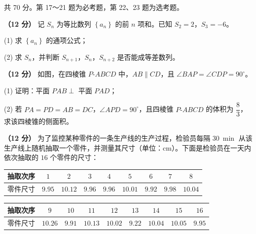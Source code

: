 \par\medskip


\begin{gktip}
共 70 分。第 17～21 题为必考题，第 22、23 题为选考题。
\end{gktip}


\textbf{（12 分）} 记 $S_n$ 为等比数列 $\left\{a_n\right\}$ 的前 $n$ 项和。已知 $S_2=2$，$S_3=-6$。

  (1) 求 $\left\{a_n\right\}$ 的通项公式；

  (2) 求 $S_n$，并判断 $S_{n+1}$，$S_n$，$S_{n+2}$ 是否能成等差数列。

\textbf{（12 分）} 如图，在四棱锥 $P\text{-}ABCD$ 中，$AB\parallel CD$，且 $\angle BAP=\angle CDP=90^\circ$。

\begin{center}\end{center}

  (1) 证明：平面 $PAB\perp$ 平面 $PAD$；

  (2) 若 $PA=PD=AB=DC$，$\angle APD=90^\circ$，且四棱锥 $P\text{-}ABCD$ 的体积为 $\dfrac83$，求该四棱锥的侧面积。

\textbf{（12 分）} 为了监控某种零件的一条生产线的生产过程，检验员每隔 $30\ \min$ 从该生产线上随机抽取一个零件，并测量其尺寸（单位：$\mathrm{cm}$）。下面是检验员在一天内依次抽取的 $16$ 个零件的尺寸：

\begin{center}
\begin{tabular}{ccccccccc}
\toprule
抽取次序 & $1$ & $2$ & $3$ & $4$ & $5$ & $6$ & $7$ & $8$ \\
\midrule
零件尺寸 & $9.95$ & $10.12$ & $9.96$ & $9.96$ & $10.01$ & $9.92$ & $9.98$ & $10.04$ \\
\bottomrule
\end{tabular}
\end{center}

\begin{center}
\begin{tabular}{ccccccccc}
\toprule
抽取次序 & $9$ & $10$ & $11$ & $12$ & $13$ & $14$ & $15$ & $16$ \\
\midrule
零件尺寸 & $10.26$ & $9.91$ & $10.13$ & $10.02$ & $9.22$ & $10.04$ & $10.05$ & $9.95$ \\
\bottomrule
\end{tabular}
\end{center}

